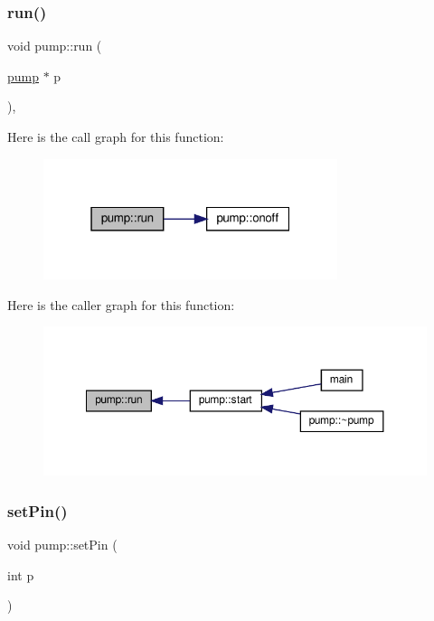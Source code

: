\subsubsection{\texorpdfstring{run()}{run()}}
{\footnotesize\ttfamily void pump\+::run (\begin{DoxyParamCaption}\item[{\hyperlink{classpump}{pump} $\ast$}]{p }\end{DoxyParamCaption})\hspace{0.3cm}{\ttfamily [static]}, {\ttfamily [private]}}

Here is the call graph for this function\+:
\nopagebreak
\begin{figure}[H]
\begin{center}
\leavevmode
\includegraphics[width=244pt]{classpump_a058e2690d8022501b5dfdc4ca646cb7c_cgraph}
\end{center}
\end{figure}
Here is the caller graph for this function\+:
\nopagebreak
\begin{figure}[H]
\begin{center}
\leavevmode
\includegraphics[width=350pt]{classpump_a058e2690d8022501b5dfdc4ca646cb7c_icgraph}
\end{center}
\end{figure}
\mbox{\label{classpump_a3c9536b9c3d2fdb7908b6cba845990d1}} 
\subsubsection{\texorpdfstring{set\+Pin()}{setPin()}}
{\footnotesize\ttfamily void pump\+::set\+Pin (\begin{DoxyParamCaption}\item[{int}]{p }\end{DoxyParamCaption})}


